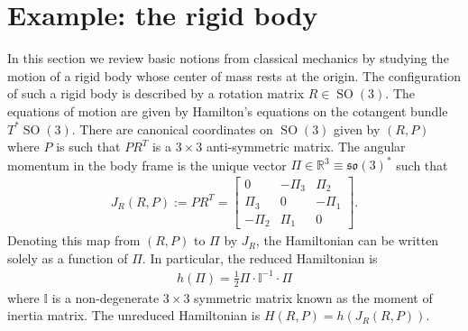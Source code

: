 \documentclass[12pt]{amsart}
\newcommand{\so}{\ensuremath{\mathfrak{so}}}
\DeclareMathOperator{\SO}{SO}
\begin{document}
\section{Example: the rigid body}
\label{sec:rigid_body}
  In this section we review basic notions from classical mechanics
by studying the motion of a rigid body whose center of mass rests
at the origin.
The configuration of such a rigid body is described by a
rotation matrix $R \in \SO(3)$.
The equations of motion are given by Hamilton's equations
on the cotangent bundle $T^*\SO(3)$.
There are canonical coordinates on $\SO(3)$ given by $(R,P)$
where $P$ is such that $P R^T$ is a $3 \times 3$ anti-symmetric matrix.
The angular momentum in the body frame is the
unique vector $\Pi \in \mathbb{R}^3 \equiv \so(3)^*$ such that
\begin{align*}
  J_R(R,P) := PR^T = \begin{bmatrix}
    0 & -\Pi_3 & \Pi_2 \\
    \Pi_3 & 0 & -\Pi_1 \\
    -\Pi_2 & \Pi_1 & 0 
    \end{bmatrix}.
\end{align*}
Denoting this map from $(R,P)$ to $\Pi$ by $J_R$,
the Hamiltonian can be written solely as a function
of $\Pi$.  In particular, the reduced Hamiltonian is
\begin{align*}
  h(\Pi) = \frac{1}{2}\Pi \cdot \mathbb{I}^{-1} \cdot \Pi
\end{align*}
where $\mathbb{I}$ is a non-degenerate $3\times 3$ symmetric matrix
known as the moment of inertia matrix.
The unreduced Hamiltonian is $H(R,P) = h(J_R(R,P))$.
\end{document}
